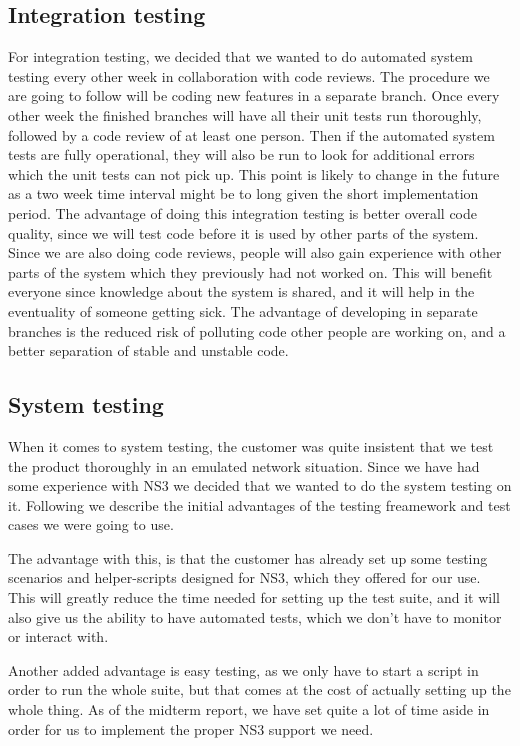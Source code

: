     \subsection{Integration testing}\label{Integration testing}
   For integration testing, we decided that we wanted to do automated system testing every other week in collaboration with code reviews. The procedure we are going to follow will be coding new features in a separate branch. Once every other week the finished branches will have all their unit tests run thoroughly, followed by a code review of at least one person. Then if the automated system tests are fully operational, they will also be run to look for additional errors which the unit tests can not pick up. This point is likely to change in the future as a two week time interval might be to long given the short implementation period. The advantage of doing this integration testing is better overall code quality, since we will test code before it is used by other parts of the system. Since we are also doing code reviews, people will also gain experience with other parts of the system which they previously had not worked on. This will benefit everyone since knowledge about the system is shared, and it will help in the eventuality of someone getting sick. The advantage of developing in separate branches is the reduced risk of polluting code other people are working on, and a better separation of stable and unstable code.

    \subsection{System testing}\label{System testing}
    
    When it comes to system testing, the customer was quite insistent that we test the product thoroughly in an emulated network situation. Since we have had some experience with NS3 we decided that we wanted to do the system testing on it. Following we describe the initial advantages of the testing freamework and test cases we were going to use. 
    
    The advantage with this, is that the customer has already set up some testing scenarios and helper-scripts designed for NS3, which they offered for our use. This will greatly reduce the time needed for setting up the test suite, and it will also give us the ability to have automated tests, which we don’t have to monitor or interact with.
    
     Another added advantage is easy testing, as we only have to start a script in order to run the whole suite, but that comes at the cost of actually setting up the whole thing. As of the midterm report, we have set quite a lot of time aside in order for us to implement the proper NS3 support we need. 
        
